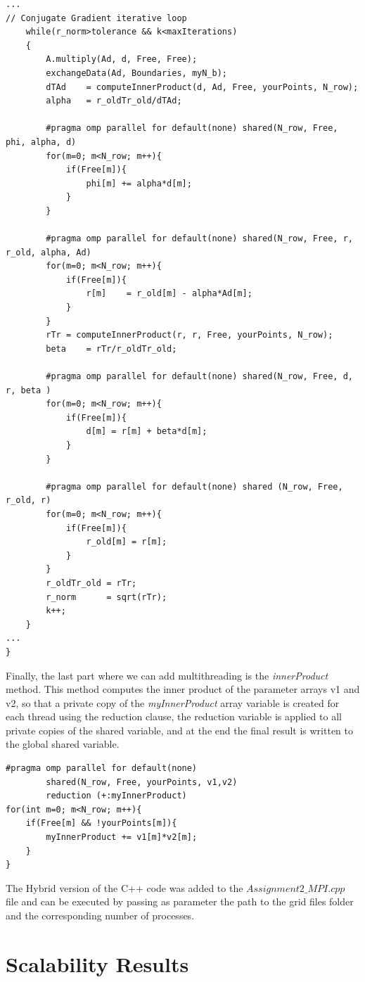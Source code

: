\documentclass[12pt]{article}
\begin{document}
\begin{lstlisting}[style=MyC++Style]
...
// Conjugate Gradient iterative loop
    while(r_norm>tolerance && k<maxIterations)
    {
    	A.multiply(Ad, d, Free, Free);
		exchangeData(Ad, Boundaries, myN_b);
		dTAd	= computeInnerProduct(d, Ad, Free, yourPoints, N_row);
		alpha  	= r_oldTr_old/dTAd;
        
		#pragma omp parallel for default(none) shared(N_row, Free, phi, alpha, d)
		for(m=0; m<N_row; m++){
			if(Free[m]){
				phi[m] += alpha*d[m];
			}
		}
        
		#pragma omp parallel for default(none) shared(N_row, Free, r, r_old, alpha, Ad)
		for(m=0; m<N_row; m++){
			if(Free[m]){
				r[m]	= r_old[m] - alpha*Ad[m];
			}
		}
		rTr	= computeInnerProduct(r, r, Free, yourPoints, N_row);
		beta  	= rTr/r_oldTr_old;
        
		#pragma omp parallel for default(none) shared(N_row, Free, d, r, beta )
		for(m=0; m<N_row; m++){
			if(Free[m]){
				d[m] = r[m] + beta*d[m];
			}
		}
        
		#pragma omp parallel for default(none) shared (N_row, Free, r_old, r)
		for(m=0; m<N_row; m++){
			if(Free[m]){
				r_old[m] = r[m];
			}
		}
		r_oldTr_old	= rTr;
		r_norm		= sqrt(rTr);
		k++;
	}
...
}
\end{lstlisting}

Finally, the last part where we can add multithreading is the \textit{innerProduct} method. This method computes the inner product of the parameter arrays v1 and v2, so that a private copy of the \textit{myInnerProduct} array variable is created for each thread using the reduction clause, the reduction variable is applied to all private copies of the shared variable, and at the end the final result is written to the global shared variable.

\begin{lstlisting}[style=MyC++Style]
#pragma omp parallel for default(none) 
		shared(N_row, Free, yourPoints, v1,v2) 
		reduction (+:myInnerProduct)
for(int m=0; m<N_row; m++){
	if(Free[m] && !yourPoints[m]){
		myInnerProduct += v1[m]*v2[m];
	}
}
\end{lstlisting}

The Hybrid version of the C++ code was added to the $\textit{Assignment2\_MPI.cpp}$ file and can be executed by passing as parameter the path to the grid files folder and the corresponding number of processes. 
	
	\section{Scalability Results}
\end{document}
